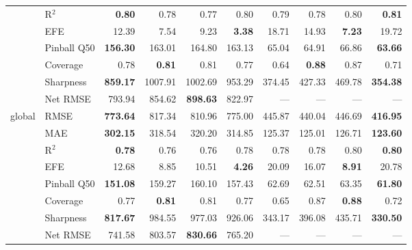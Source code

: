\begin{table}[htbp]
\begin{tabular}{llrrrrrrrr}
 & R$^2$ & \bfseries 0.80 & 0.78 & 0.77 & 0.80 & 0.79 & 0.78 & 0.80 & \bfseries 0.81 \\
 & EFE & 12.39 & 7.54 & 9.23 & \bfseries 3.38 & 18.71 & 14.93 & \bfseries 7.23 & 19.72 \\
 & Pinball Q50 & \bfseries 156.30 & 163.01 & 164.80 & 163.13 & 65.04 & 64.91 & 66.86 & \bfseries 63.66 \\
 & Coverage & 0.78 & \bfseries 0.81 & 0.81 & 0.77 & 0.64 & \bfseries 0.88 & 0.87 & 0.71 \\
 & Sharpness & \bfseries 859.17 & 1007.91 & 1002.69 & 953.29 & 374.45 & 427.33 & 469.78 & \bfseries 354.38 \\
 & Net RMSE & 793.94 & 854.62 & \bfseries 898.63 & 822.97 & --- & --- & --- & --- \\
\midrule
\multirow[c]{8}{*}{global} & RMSE & \bfseries 773.64 & 817.34 & 810.96 & 775.00 & 445.87 & 440.04 & 446.69 & \bfseries 416.95 \\
 & MAE & \bfseries 302.15 & 318.54 & 320.20 & 314.85 & 125.37 & 125.01 & 126.71 & \bfseries 123.60 \\
 & R$^2$ & \bfseries 0.78 & 0.76 & 0.76 & 0.78 & 0.78 & 0.78 & 0.80 & \bfseries 0.80 \\
 & EFE & 12.68 & 8.85 & 10.51 & \bfseries 4.26 & 20.09 & 16.07 & \bfseries 8.91 & 20.78 \\
 & Pinball Q50 & \bfseries 151.08 & 159.27 & 160.10 & 157.43 & 62.69 & 62.51 & 63.35 & \bfseries 61.80 \\
 & Coverage & 0.77 & \bfseries 0.81 & 0.81 & 0.77 & 0.65 & 0.87 & \bfseries 0.88 & 0.72 \\
 & Sharpness & \bfseries 817.67 & 984.55 & 977.03 & 926.06 & 343.17 & 396.08 & 435.71 & \bfseries 330.50 \\
 & Net RMSE & 741.58 & 803.57 & \bfseries 830.66 & 765.20 & --- & --- & --- & --- \\
\bottomrule
\end{tabular}
\end{table}
